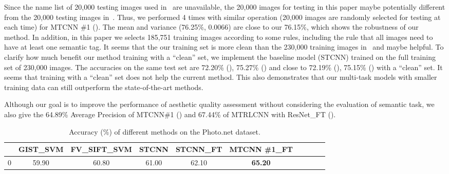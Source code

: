 \documentclass[journal]{IEEEtran}
\begin{document}
Since the name list of 20,000 testing images used in~\cite{Murray12,lu14,lu2015deep,mai2016composition} are unavailable, the 20,000 images for testing in this paper maybe potentially different from the 20,000 testing images in~\cite{Murray12,lu14,lu2015deep,mai2016composition}. Thus, we performed 4 times with similar operation (20,000 images are randomly selected for testing at each time) for MTCNN \#1 (). The mean and variance (76.25\%, 0.0066) are close to our 76.15\%, which shows the robustness of our method. In addition, in this paper we selects 185,751 training images according to some rules, including the rule that all images need to have at least one semantic tag. It seems that the our training set is more clean than the 230,000 training images in~\cite{Murray12,lu14,lu2015deep,mai2016composition} and maybe helpful. To clarify how much benefit our method training with a ``clean'' set, we implement the baseline model (STCNN) trained on the full training set of 230,000 images. The accuracies on the same test set are 72.20\% (), 75.27\% () and close to 72.19\% (), 75.15\% () with a ``clean'' set. It seems that training with a ``clean'' set does not help the current method. This also demonstrates that our multi-task models with smaller training data can still outperform the state-of-the-art methods.

Although our goal is to improve the performance of aesthetic quality assessment without considering the evaluation of semantic task, we also give the 64.89\% Average Precision of MTCNN\#1 () and 67.44\% of MTRLCNN with ResNet\_FT ().
\begin{table}
\caption{Accuracy (\%) of different methods on the Photo.net dataset.}
\renewcommand{\arraystretch}{1.4}
\newcommand{\tabincell}[2]{\begin{tabular}{@{}#1@{}}#2\end{tabular}}
\setlength{\abovecaptionskip}{0pt}
\setlength{\belowcaptionskip}{0pt}
\arrayrulewidth=0.6pt \tabcolsep=1pt
  \centering
\small
  \begin{tabular}{|c|c|c|c|c|c|c|c|c|c|}
    \hline
&GIST\_SVM& FV\_SIFT\_SVM & STCNN& STCNN\_FT& MTCNN \#1\_FT   \\
    \hline
0 &59.90& 60.80 &61.00 & 62.10& \textbf{65.20}\\
     \hline
\end{tabular}
\verb''\\
\label{tab:photo}
\end{table}
\end{document}
